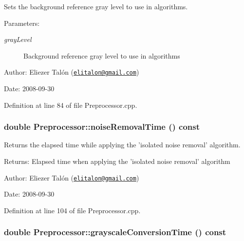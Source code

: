 Sets the background reference gray level to use in algorithms. 

\begin{Desc}
\item[Parameters:]
\begin{description}
\item[{\em grayLevel}]Background reference gray level to use in algorithms\end{description}
\end{Desc}
\begin{Desc}
\item[Author:]Eliezer Talón (\href{mailto:elitalon@gmail.com}{\tt elitalon@gmail.com}) \end{Desc}
\begin{Desc}
\item[Date:]2008-09-30 \end{Desc}


Definition at line 84 of file Preprocessor.cpp.\hypertarget{class_preprocessor_0cccd23820430541f18f2b24dbfd0784}{
\subsubsection[noiseRemovalTime]{\setlength{\rightskip}{0pt plus 5cm}double Preprocessor::noiseRemovalTime () const}}
\label{class_preprocessor_0cccd23820430541f18f2b24dbfd0784}


Returns the elapsed time while applying the 'isolated noise removal' algorithm. 

\begin{Desc}
\item[Returns:]Elapsed time when applying the 'isolated noise removal' algorithm\end{Desc}
\begin{Desc}
\item[Author:]Eliezer Talón (\href{mailto:elitalon@gmail.com}{\tt elitalon@gmail.com}) \end{Desc}
\begin{Desc}
\item[Date:]2008-09-30 \end{Desc}


Definition at line 104 of file Preprocessor.cpp.\hypertarget{class_preprocessor_7afe140bf2697393170fb8e2ccb818d5}{
\subsubsection[grayscaleConversionTime]{\setlength{\rightskip}{0pt plus 5cm}double Preprocessor::grayscaleConversionTime () const}}
\label{class_preprocessor_7afe140bf2697393170fb8e2ccb818d5}


